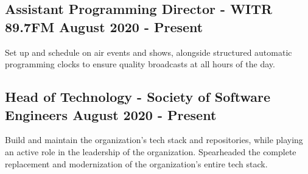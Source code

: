 \documentclass[11pt, letterpaper]{article}
\begin{document}
        \subsection{Assistant Programming Director - WITR 89.7FM \hfill August 2020 - Present}
            Set up and schedule on air events and shows, alongside structured automatic programming clocks to 
            ensure quality broadcasts at all hours of the day.

        \subsection{Head of Technology - Society of Software Engineers \hfill August 2020 - Present}
            Build and maintain the organization's tech stack and repositories, while playing an active role 
            in the leadership of the organization. Spearheaded the complete replacement and modernization of 
            the organization's entire tech stack.
\end{document}
